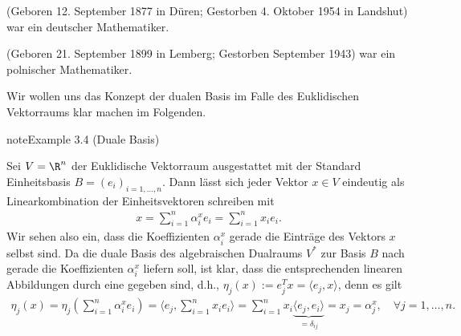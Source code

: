 \documentclass[letterpaper,10pt,german]{jupyterBook}
\begin{document}
\begin{sphinxShadowBox}

\sphinxAtStartPar
{} (Geboren 12. September 1877 in Düren; Gestorben 4. Oktober 1954 in Landshut) war ein deutscher Mathematiker.
\end{sphinxShadowBox}

\begin{sphinxShadowBox}

\sphinxAtStartPar
{} (Geboren 21. September 1899 in Lemberg; Gestorben September 1943) war ein polnischer Mathematiker.
\end{sphinxShadowBox}

\sphinxAtStartPar
Wir wollen uns das Konzept der dualen Basis im Falle des Euklidischen Vektorraums klar machen im Folgenden.
\label{vektoranalysis/multilinear:example-12}
\begin{sphinxadmonition}{note}{Example 3.4 (Duale Basis)}



\sphinxAtStartPar
Sei \(V = \R^n\) der Euklidische Vektorraum ausgestattet mit der Standard Einheitsbasis \(B = (e_i)_{i=1,\ldots,n}\).
Dann lässt sich jeder Vektor \(x \in V\) eindeutig als Linearkombination der Einheitsvektoren schreiben mit
\begin{equation*}
\begin{split}x = \sum_{i=1}^n \alpha_i^x e_i = \sum_{i=1}^n x_i e_i.\end{split}
\end{equation*}
\sphinxAtStartPar
Wir sehen also ein, dass die Koeffizienten \(\alpha_i^x\) gerade die Einträge des Vektors \(x\) selbst sind.
Da die duale Basis des algebraischen Dualraums \(V^\ast\) zur Basis \(B\) nach {\hyperref[\detokenize{vektoranalysis/multilinear:lem:dualeBasis}]{}} gerade die Koeffizienten \(\alpha_i^x\) liefern soll, ist klar, dass die entsprechenden linearen Abbildungen durch eine  gegeben sind, d.h., \(\eta_j(x) := e_j^T x = \langle e_j, x \rangle\), denn es gilt
\begin{equation*}
\begin{split}\eta_j(x) = 
\eta_j \left( \sum_{i=1}^n \alpha_i^x e_i \right) = 
\langle e_j, \sum_{i=1}^n x_i e_i\rangle =
\sum_{i=1}^n x_i \underbrace{\langle e_j, e_i\rangle}_{= \delta_{ij}} =  
x_j = \alpha_j^x, \quad \forall j=1,\ldots,n.\end{split}
\end{equation*}\end{sphinxadmonition}
\end{document}
